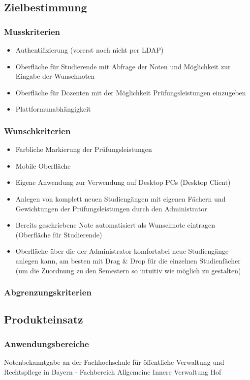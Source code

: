 \documentclass[12pt,a4paper,parskip]{scrreprt}
\begin{document}
\subsection{Zielbestimmung}
\subsubsection{Musskriterien}
\begin{itemize}
\item Authentifizierung (vorerst noch nicht per LDAP)
\item Oberfläche für Studierende mit Abfrage der Noten und Möglichkeit zur Eingabe der Wunschnoten
\item Oberfläche für Dozenten mit der Möglichkeit Prüfungsleistungen einzugeben
\item Plattformunabhängigkeit
\end{itemize}
\subsubsection{Wunschkriterien}
\begin{itemize}
\item Farbliche Markierung der Prüfungsleistungen
\item Mobile Oberfläche
\item Eigene Anwendung zur Verwendung auf Desktop PCs (Desktop Client)
\item Anlegen von komplett neuen Studiengängen mit eigenen Fächern und Gewichtungen der Prüfungsleistungen durch den Administrator
\item Bereits geschriebene Note automatisiert als Wunschnote eintragen (Oberfläche für Studierende)
\item Oberfläche über die der Administrator komfortabel neue Studiengänge anlegen kann, am besten mit Drag \& Drop für die einzelnen Studienfächer (um die Zuordnung zu den Semestern so intuitiv wie möglich zu gestalten)
\end{itemize}
\subsubsection{Abgrenzungskriterien}
\subsection{Produkteinsatz}
\subsubsection{Anwendungsbereiche}
Notenbekanntgabe an der Fachhochschule für öffentliche Verwaltung und Rechtspflege in Bayern - Fachbereich Allgemeine Innere Verwaltung Hof
\end{document}
